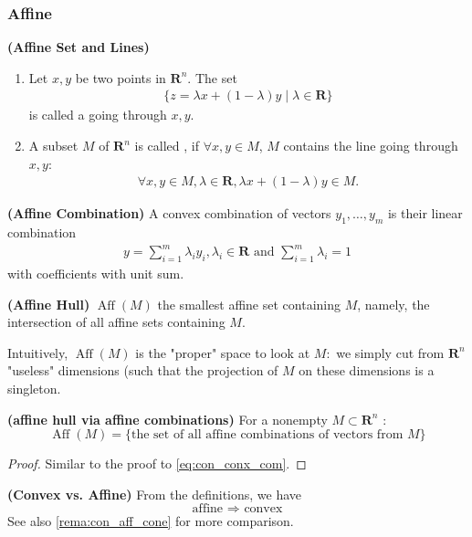 \documentclass{article}
\newcommand{\bfs}[1]{\textbf{({#1}) }}
\newcommand{\Aff}{\operatorname{Aff}}
\begin{document}
\subsubsection{Affine}\label{sec:affine}
\begin{defa}{\bfs{Affine Set and Lines}}
 \begin{enumerate}
     \item Let $x, y$ be two points in $\mathbf{R}^{n}$. The set
\begin{align*}
\{z=\lambda x+(1-\lambda) y \mid \lambda \in\mathbf{R}\}
\end{align*}
is called a  going through $x, y .$
\item A subset $M$ of $\mathbf{R}^{n}$ is called , if $\forall x, y\in M$, $M$ contains the line going through $x, y $:
\begin{align*}
\forall x, y \in M, \lambda \in \mathbf{R}, \lambda x+(1-\lambda) y \in M.
\end{align*}
 \end{enumerate}
\end{defa}

\begin{defa}{\bfs{Affine Combination}}\label{def:aff_com}
 A convex combination of  vectors $y_{1}, \ldots, y_{m}$ is their linear combination
\begin{align*}
y=\sum_{i=1}^{m} \lambda_{i} y_{i}, \lambda_{i} \in \mathbf{R} \text{ and } \sum_{i=1}^{m} \lambda_{i}=1
\end{align*}
with  coefficients with unit sum.
\end{defa}

\begin{defa}{\bfs{Affine Hull}}
 $\Aff(M)$ the smallest affine set containing $M$, namely, the intersection of all affine sets containing $M$. 
\end{defa}
\begin{rema}
Intuitively,  $\Aff(M)$ is the "proper" space to look at $M:$ we simply cut from $\mathbf{R}^{n}$ "useless" dimensions (such that the projection of $M$ on these dimensions is a singleton.
\end{rema}

\begin{cora}{\bfs{affine hull via affine combinations}}
For a nonempty $M \subset \mathbf{R}^{n}$ :
$$\operatorname{Aff}(M)=\{ \text{the set of all affine combinations of vectors from } M\} $$
\end{cora}
\begin{proof}\color{ForestGreen}
Similar to the proof to \cref{eq:con_conx_com}.
\end{proof}
\begin{rema}{\bfs{Convex vs. Affine}} From the definitions, we have 
$$\text{affine } \Rightarrow \text{ convex}$$
See also \cref{rema:con_aff_cone} for more comparison.
\end{rema}
\end{document}
